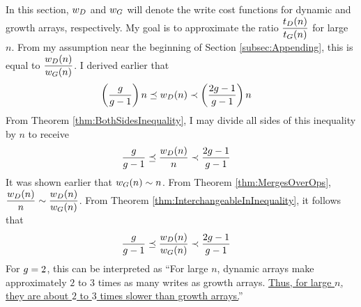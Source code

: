 \HdrTimeComplexCmp

In this section, $w_D$ and $w_G$ will denote the write cost functions for dynamic and growth arrays, respectively. My goal is to approximate the ratio $\dfrac{t_D(n)}{t_G(n)}$ for large $n$. From my assumption near the beginning of Section \ref{subsec:Appending}, this is equal to $\dfrac{w_D(n)}{w_G(n)}$. I derived earlier that
\begin{align*}
\left( \frac{g}{g - 1} \right) n \preceq w_D(n) &\prec \left( \frac{2g - 1}{g - 1} \right) n
\end{align*}
From Theorem \ref{thm:BothSidesInequality}, I may divide all sides of this inequality by $n$ to receive
\begin{align*}
\frac{g}{g - 1} \preceq \frac {w_D(n)} n &\prec \frac{2g - 1}{g - 1}
\end{align*}
It was shown earlier that $w_G(n) \sim n$. From Theorem \ref{thm:MergesOverOps}, $\dfrac {w_D(n)} n \sim \dfrac{w_D(n)}{w_G(n)}$. From Theorem \ref{thm:InterchangeableInInequality}, it follows that
\begin{align*}
\frac{g}{g - 1} \preceq \frac {w_D(n)} {w_G(n)} &\prec \frac{2g - 1}{g - 1}
\end{align*}
For $g = 2$, this can be interpreted as ``For large $n$, dynamic arrays make approximately $2$ to $3$ times as many writes as growth arrays. \underline{Thus, for large $n$, they are about $2$ to $3$ times slower than growth arrays.}''

\HdrSpaceComplexCmp

